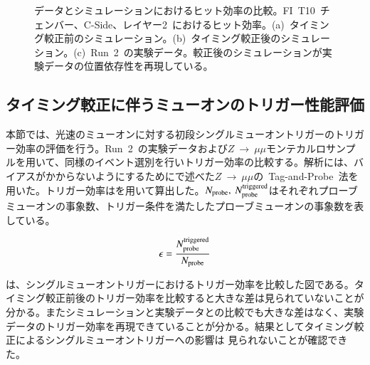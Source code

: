 \begin{figure}[tbp]
\begin{minipage}{0.99\hsize}
	\subcaption{}
	\end{minipage}
	\caption[データとシミュレーションにおけるヒット効率の比較]{データとシミュレーションにおけるヒット効率の比較。FI~T10~チェンバー、C-Side、レイヤー2~におけるヒット効率。(a)~タイミング較正前のシミュレーション。(b)~タイミング較正後のシミュレーション。(c)~Run~2~の実験データ。較正後のシミュレーションが実験データの位置依存性を再現している。}
	\label{fig:hiteff}
\end{figure}


\subsection{タイミング較正に伴うミューオンのトリガー性能評価}
本節では、光速のミューオンに対する初段シングルミューオントリガーのトリガー効率の評価を行う。Run~2~の実験データおよび$Z~→~\mu\mu$モンテカルロサンプルを用いて、同様のイベント選別を行いトリガー効率の比較する。解析には、バイアスがかからないようにするためにで述べた$Z~→~\mu\mu$の~Tag-and-Probe~法を用いた。トリガー効率はを用いて算出した。$N_{\rm{probe}},~N_{\rm{probe}}^{\rm{triggered}}$はそれぞれプローブミューオンの事象数、トリガー条件を満たしたプローブミューオンの事象数を表している。

\begin{align}
    \epsilon=\frac{N_{\rm{probe}}^{\rm{triggered}}}{N_{\rm{probe}}}
    \label{eq:eff}
\end{align}

は、シングルミューオントリガーにおけるトリガー効率を比較した図である。タイミング較正前後のトリガー効率を比較すると大きな差は見られていないことが分かる。またシミュレーションと実験データとの比較でも大きな差はなく、実験データのトリガー効率を再現できていることが分かる。結果としてタイミング較正によるシングルミューオントリガーへの影響は
見られないことが確認できた。

